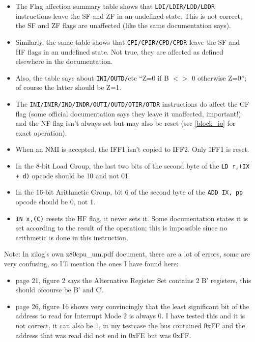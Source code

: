 \documentclass[12pt,twoside,openright,a4paper]{book}
\begin{document}
\begin{itemize}

	\item
	The Flag affection summary table shows that {\tt LDI/LDIR/LDD/LDDR} instructions leave the SF and ZF in an undefined state. This is not correct; the SF and ZF flags are unaffected (like the same documentation says).

	\item
	Similarly, the same table shows that {\tt CPI/CPIR/CPD/CPDR} leave the SF and HF flags in an undefined state. Not true, they are affected as defined elsewhere in the documentation.

	\item
	Also, the table says about {\tt INI/OUTD/}etc ``Z=0 if B $<>$ 0 otherwise Z=0''; of course the latter should be Z=1.

	\item
	The {\tt INI/INIR/IND/INDR/OUTI/OUTD/OTIR/OTDR} instructions do affect the CF flag (some official documentation says they leave it unaffected, important!) and the NF flag isn't always set but may also be reset (see \ref{block_io} for exact operation).

	\item
	When an NMI is accepted, the IFF1 isn't copied to IFF2. Only IFF1 is reset.

	\item
	In the 8-bit Load Group, the last two bits of the second byte of the {\tt LD r,(IX + d)} opcode should be 10 and not 01.

	\item
	In the 16-bit Arithmetic Group, bit 6 of the second byte of the {\tt ADD IX, pp} opcode should be 0, not 1.

	\item
	{\tt IN x,(C)} resets the HF flag, it never sets it. Some documentation states it is set according to the result of the operation; this is impossible since no arithmetic is done in this instruction.

\end{itemize}

Note: In zilog's own z80cpu\_um.pdf document, there are a lot of errors, some are very confusing, so I'll mention the ones I have found here:

\begin{itemize}

	\item
	page 21, figure 2 says the Alternative Register Set contains 2 B' registers, this should ofcourse be B' and C'.  

	\item
	page 26, figure 16 shows very convincingly that the least significant bit of the address to read for Interrupt Mode 2 is always 0. I have tested this and it is not correct, it can also be 1, in my testcase the bus contained 0xFF and the address that was read did not end in 0xFE but was 0xFF.
  
\end{itemize}
\end{document}
